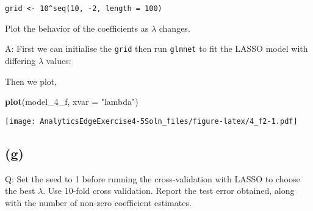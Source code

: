 \documentclass[
]{article}
\newenvironment{Shaded}{\begin{snugshade}}{\end{snugshade}}
\newcommand{\DataTypeTok}[1]{\textcolor[rgb]{0.13,0.29,0.53}{#1}}
\newcommand{\DecValTok}[1]{\textcolor[rgb]{0.00,0.00,0.81}{#1}}
\newcommand{\KeywordTok}[1]{\textcolor[rgb]{0.13,0.29,0.53}{\textbf{#1}}}
\newcommand{\NormalTok}[1]{#1}
\newcommand{\OperatorTok}[1]{\textcolor[rgb]{0.81,0.36,0.00}{\textbf{#1}}}
\newcommand{\StringTok}[1]{\textcolor[rgb]{0.31,0.60,0.02}{#1}}
\begin{document}
\texttt{grid\ \textless{}-\ 10\^{}seq(10,\ -2,\ length\ =\ 100)}

Plot the behavior of the coefficients as \(\lambda\) changes.

A: First we can initialise the \texttt{grid} then run \texttt{glmnet} to
fit the LASSO model with differing \(\lambda\) values:

\begin{Shaded}
\end{Shaded}

Then we plot,

\begin{Shaded}
\begin{Highlighting}[]
\KeywordTok{plot}\NormalTok{(model_}\DecValTok{4}\NormalTok{_f, }\DataTypeTok{xvar =} \StringTok{"lambda"}\NormalTok{)}
\end{Highlighting}
\end{Shaded}

\texttt{[image: AnalyticsEdgeExercise4-5Soln\_files/figure-latex/4\_f2-1.pdf]}

\hypertarget{g}{%
\subsection{(g)}\label{g}}

Q: Set the seed to 1 before running the cross-validation with LASSO to
choose the best \(\lambda\). Use 10-fold cross validation. Report the
test error obtained, along with the number of non-zero coefficient
estimates.
\end{document}
